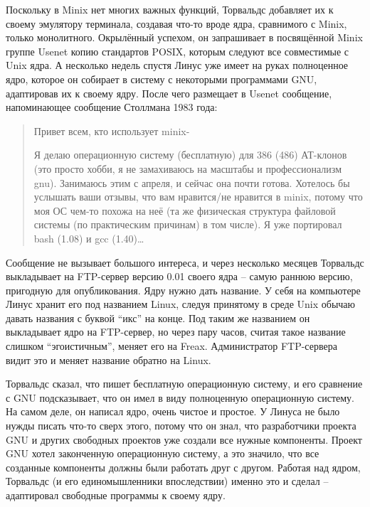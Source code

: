Поскольку в Minix нет многих важных функций, Торвальдс добавляет их к своему эмулятору терминала, создавая что-то вроде ядра, сравнимого с Minix, только монолитного. Окрылённый успехом, он запрашивает в посвящённой Minix группе Usenet копию стандартов POSIX, которым следуют все совместимые с Unix ядра. А несколько недель спустя Линус уже имеет на руках полноценное ядро, которое он собирает в систему с некоторыми программами GNU, адаптировав их к своему ядру. После чего размещает в Usenet сообщение, напоминающее сообщение Столлмана 1983 года:

\begin{quote}
Привет всем, кто использует minix-

Я делаю операционную систему (бесплатную) для 386 (486) АТ-клонов (это просто хобби, я не замахиваюсь на масштабы и профессионализм gnu). Занимаюсь этим с апреля, и сейчас она почти готова. Хотелось бы услышать ваши отзывы, что вам нравится/не нравится в minix, потому что моя ОС чем-то похожа на неё (та же физическая структура файловой системы (по практическим причинам) в том числе). Я уже портировал bash (1.08) и gcc (1.40)\ldots{}
\end{quote}

Сообщение не вызывает большого интереса, и через несколько месяцев Торвальдс выкладывает на FTP-сервер версию 0.01 своего ядра -- самую раннюю версию, пригодную для опубликования. Ядру нужно дать название. У себя на компьютере Линус хранит его под названием Linux, следуя принятому в среде Unix обычаю давать названия с буквой ``икс'' на конце. Под таким же названием он выкладывает ядро на FTP-сервер, но через пару часов, считая такое название слишком ``эгоистичным'', меняет его на Freax. Администратор FTP-сервера видит это и меняет название обратно на Linux.

Торвальдс сказал, что пишет бесплатную операционную систему, и его сравнение с GNU подсказывает, что он имел в виду полноценную операционную систему. На самом деле, он написал ядро, очень чистое и простое. У Линуса не было нужды писать что-то сверх этого, потому что он знал, что разработчики проекта GNU и других свободных проектов уже создали все нужные компоненты. Проект GNU хотел законченную операционную систему, а это значило, что все созданные компоненты должны были работать друг с другом. Работая над ядром, Торвальдс (и его единомышленники впоследствии) именно это и сделал -- адаптировал свободные программы к своему ядру.

